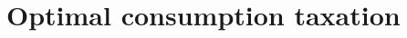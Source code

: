 \section{Optimal consumption taxation}


% 
%
% 


\clearpage
\printbibliography
\clearpage

%
%
%
% 


